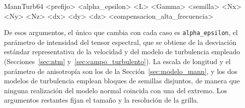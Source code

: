 \begin{cfgcode}
MannTurb64  <prefijo>  <alpha_epsilon>  <L>  <Gamma>  <semilla>
            <Nx>  <Ny>  <Nz>  <dx>  <dy>  <dz>  <compensacion_alta_frecuencia>
\end{cfgcode}

\noindent De esos argumentos, el único que cambia con cada caso es
\texttt{alpha\_epsilon}, el parámetro de intensidad del tensor espectral, que se obtiene
de la desviación estándar representativa de la velocidad y del modelo de turbulencia
empleado (Secciones~\ref{sec:ntm} y~\ref{sec:campo_turbulento}). La escala de longitud y
el parámetro de anisotropía son los de la Sección~\ref{sec:modelo_mann}, y los dos
modelos de turbulencia emplean bloques de semillas disjuntos, de manera que ninguna
realización del modelo normal coincida con una del extremo. Los argumentos restantes fijan
el tamaño y la resolución de la grilla.
